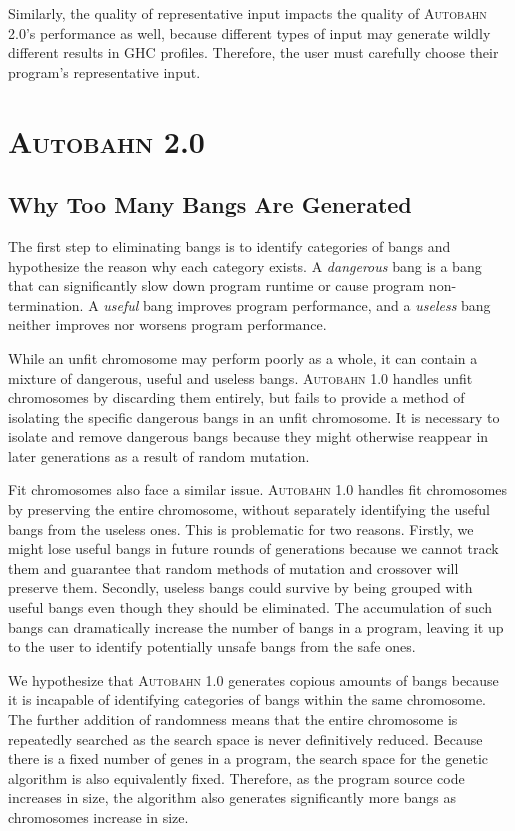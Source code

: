 \documentclass[format=sigplan, review=true]{acmart}
\newcommand{\unfit}[0]{unfit}
\newcommand{\dangerous}[0]{dangerous}
\newcommand{\useful}[0]{useful}
\newcommand{\useless}[0]{useless}
\newcommand{\Ao}[0]{\textsc{Autobahn 1.0}}
\newcommand{\At}[0]{\textsc{Autobahn 2.0}}
\newcommand{\fit}[0]{fit}
\begin{document}
Similarly, the quality of representative input impacts the quality of \At{}'s performance as well, because different types of input may generate wildly different results in GHC profiles. Therefore, the user must carefully choose their program's representative input.

\section{\At{}}
\subsection{Why Too Many Bangs Are Generated}

The first step to eliminating bangs is to identify categories of bangs and hypothesize the reason why each category exists. A \textit{\dangerous{}} bang is a bang that can significantly slow down program runtime or cause program non-termination. A \textit{\useful{}} bang improves program performance, and a \textit{\useless{}} bang neither improves nor worsens program performance. 

While an \unfit{} chromosome may perform poorly as a whole, it can contain a mixture of \dangerous, \useful{} and \useless{} bangs. \Ao{} handles \unfit{} chromosomes by discarding them entirely, but fails to provide a method of isolating the specific \dangerous{} bangs in an \unfit{} chromosome. It is necessary to isolate and remove \dangerous{} bangs because they might otherwise reappear in later generations as a result of random mutation. 

Fit chromosomes also face a similar issue. \Ao{} handles \fit{} chromosomes by preserving the entire chromosome, without separately identifying the \useful{} bangs from the \useless{} ones. This is problematic for two reasons. Firstly, we might lose \useful{} bangs in future rounds of generations because we cannot track them and guarantee that random methods of mutation and crossover will preserve them. Secondly, \useless{} bangs could survive by being grouped with \useful{} bangs even though they should be eliminated. The accumulation of such bangs can dramatically increase the number of bangs in a program, leaving it up to the user to identify potentially unsafe bangs from the safe ones. 

We hypothesize that \Ao{} generates copious amounts of bangs because it is incapable of identifying categories of bangs within the same chromosome. The further addition of randomness means that the entire chromosome is repeatedly searched as the search space is never definitively reduced. Because there is a fixed number of genes in a program, the search space for the genetic algorithm is also equivalently fixed. Therefore, as the program source code increases in size, the algorithm also generates significantly more bangs as chromosomes increase in size. 
\end{document}
